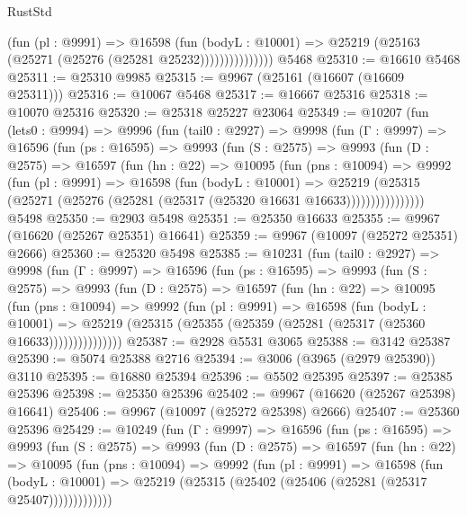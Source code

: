 \begin{lexlean}{RustStd}
\begin{coremodule}
                      (fun (pl : @9991) =>
                      @16598
                        (fun (bodyL : @10001) =>
                        @25219 (@25163 (@25271 (@25276 (@25281 @25232)))))))))))))))
    @5468
@25310 := @16610 @5468
@25311 := @25310 @9985
@25315 := @9967 (@25161 (@16607 (@16609 @25311)))
@25316 := @10067 @5468
@25317 := @16667 @25316
@25318 := @10070 @25316
@25320 := @25318 @25227 @23064
@25349 := @10207
    (fun (lets0 : @9994) =>
    @9996
      (fun (tail0 : @2927) =>
      @9998
        (fun (Γ : @9997) =>
        @16596
          (fun (ps : @16595) =>
          @9993
            (fun (S : @2575) =>
            @9993
              (fun (D : @2575) =>
              @16597
                (fun (hn : @22) =>
                @10095
                  (fun (pns : @10094) =>
                  @9992
                    (fun (pl : @9991) =>
                    @16598
                      (fun (bodyL : @10001) =>
                      @25219
                        (@25315
                          (@25271 (@25276 (@25281 (@25317 (@25320 @16631 @16633))))))))))))))))
    @5498
@25350 := @2903 @5498
@25351 := @25350 @16633
@25355 := @9967 (@16620 (@25267 @25351) @16641)
@25359 := @9967 (@10097 (@25272 @25351) @2666)
@25360 := @25320 @5498
@25385 := @10231
    (fun (tail0 : @2927) =>
    @9998
      (fun (Γ : @9997) =>
      @16596
        (fun (ps : @16595) =>
        @9993
          (fun (S : @2575) =>
          @9993
            (fun (D : @2575) =>
            @16597
              (fun (hn : @22) =>
              @10095
                (fun (pns : @10094) =>
                @9992
                  (fun (pl : @9991) =>
                  @16598
                    (fun (bodyL : @10001) =>
                    @25219 (@25315 (@25355 (@25359 (@25281 (@25317 (@25360 @16633)))))))))))))))
@25387 := @2928 @5531 @3065
@25388 := @3142 @25387
@25390 := @5074 @25388 @2716
@25394 := @3006 (@3965 (@2979 @25390)) @3110
@25395 := @16880 @25394
@25396 := @5502 @25395
@25397 := @25385 @25396
@25398 := @25350 @25396
@25402 := @9967 (@16620 (@25267 @25398) @16641)
@25406 := @9967 (@10097 (@25272 @25398) @2666)
@25407 := @25360 @25396
@25429 := @10249
    (fun (Γ : @9997) =>
    @16596
      (fun (ps : @16595) =>
      @9993
        (fun (S : @2575) =>
        @9993
          (fun (D : @2575) =>
          @16597
            (fun (hn : @22) =>
            @10095
              (fun (pns : @10094) =>
              @9992
                (fun (pl : @9991) =>
                @16598
                  (fun (bodyL : @10001) =>
                  @25219 (@25315 (@25402 (@25406 (@25281 (@25317 @25407)))))))))))))

\end{coremodule}
\end{lexlean}
